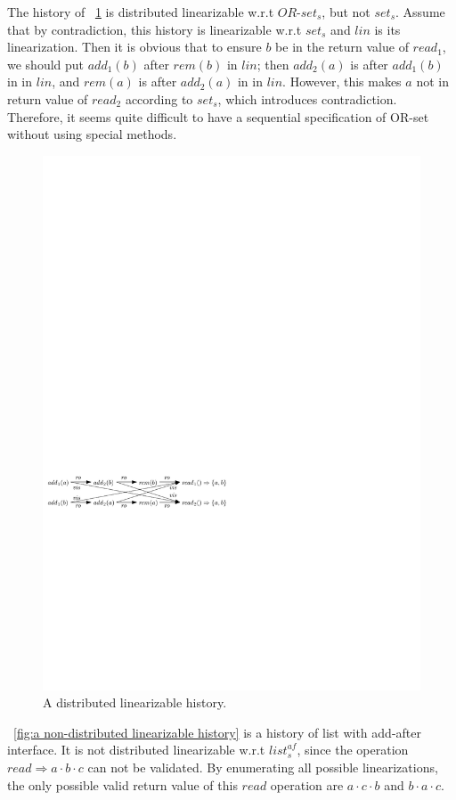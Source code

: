 {The history of \figurename~\ref{fig:a distributed linearizable history} is distributed linearizable w.r.t $\mathit{OR}$-$\mathit{set}_s$, but not $\mathit{set}_s$. Assume that by contradiction, this history is linearizable w.r.t $\mathit{set}_s$ and $\mathit{lin}$ is its linearization. Then it is obvious that to ensure $b$ be in the return value of $\mathit{read}_1$, we should put $\mathit{add}_1(b)$ after $\mathit{rem}(b)$ in $\mathit{lin}$; then $\mathit{add}_2(a)$ is after $\mathit{add}_1(b)$ in in $\mathit{lin}$, and $\mathit{rem}(a)$ is after $\mathit{add}_2(a)$ in in $\mathit{lin}$. However, this makes $a$ not in return value of $\mathit{read}_2$ according to $\mathit{set}_s$, which introduces contradiction. Therefore, it seems quite difficult to have a sequential specification of OR-set without using special methods.

\begin{figure}[t]
  \centering
  \includegraphics[width=0.7 \textwidth]{figures/PIC-His-Lin-ORSet.pdf}
  \caption{A distributed linearizable history.}
  \label{fig:a distributed linearizable history}
\end{figure}

\figurename~\ref{fig:a non-distributed linearizable history} is a history of list with add-after interface. It is not distributed linearizable w.r.t $\mathit{list}_s^{\mathit{af}}$, since the operation $\mathit{read} \Rightarrow a \cdot b \cdot c$ can not be validated. By enumerating all possible linearizations, the only possible valid return value of this $\mathit{read}$ operation are $a \cdot c \cdot b$ and $b \cdot a \cdot c$.

}
